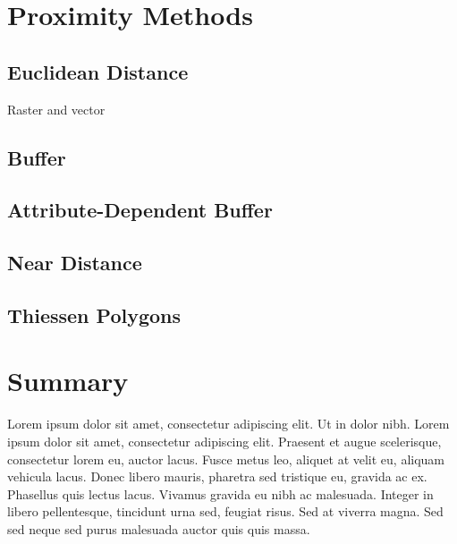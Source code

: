\documentclass[
]{book}
\begin{document}
\hypertarget{proximity-methods}{%
\section{Proximity Methods}\label{proximity-methods}}

\hypertarget{euclidean-distance}{%
\subsection{Euclidean Distance}\label{euclidean-distance}}

Raster and vector

\hypertarget{buffer}{%
\subsection{Buffer}\label{buffer}}

\hypertarget{attribute-dependent-buffer}{%
\subsection{Attribute-Dependent Buffer}\label{attribute-dependent-buffer}}

\hypertarget{near-distance}{%
\subsection{Near Distance}\label{near-distance}}

\hypertarget{thiessen-polygons}{%
\subsection{Thiessen Polygons}\label{thiessen-polygons}}

\hypertarget{summary-6}{%
\section{Summary}\label{summary-6}}

Lorem ipsum dolor sit amet, consectetur adipiscing elit. Ut in dolor nibh. Lorem ipsum dolor sit amet, consectetur adipiscing elit. Praesent et augue scelerisque, consectetur lorem eu, auctor lacus. Fusce metus leo, aliquet at velit eu, aliquam vehicula lacus. Donec libero mauris, pharetra sed tristique eu, gravida ac ex. Phasellus quis lectus lacus. Vivamus gravida eu nibh ac malesuada. Integer in libero pellentesque, tincidunt urna sed, feugiat risus. Sed at viverra magna. Sed sed neque sed purus malesuada auctor quis quis massa.
\end{document}
